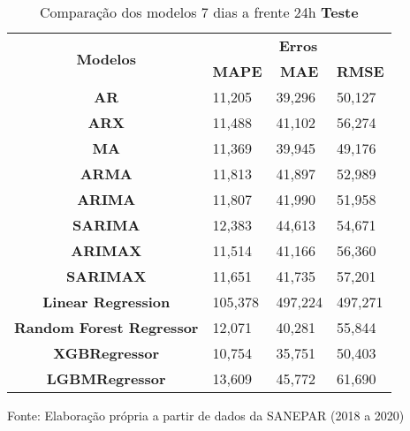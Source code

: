 \begin{table}[H]
	\centering
	\caption{Comparação dos modelos 7 dias a frente 24h \textbf{Teste} }\label{tb:10-24tst}
	\begin{tabular}{@{}clll@{}}
		\toprule
		\multirow{2}{*}{\textbf{Modelos}} & \multicolumn{3}{c}{\textbf{Erros}}                                                                       \\ \cmidrule(l){2-4} 
		& \multicolumn{1}{c}{\textbf{MAPE}} & \multicolumn{1}{c}{\textbf{MAE}} & \multicolumn{1}{c}{\textbf{RMSE}} \\ \hline
\textbf{AR}                       & 11,205                            & 39,296                           & 50,127                            \\
\textbf{ARX}                      & 11,488                            & 41,102                           & 56,274                            \\
\textbf{MA}                       & 11,369                            & 39,945                           & 49,176                            \\
\textbf{ARMA}                     & 11,813                            & 41,897                           & 52,989                            \\
\textbf{ARIMA}                    & 11,807                            & 41,990                           & 51,958                            \\
\textbf{SARIMA}                   & 12,383                            & 44,613                           & 54,671                            \\
\textbf{ARIMAX}                   & 11,514                            & 41,166                           & 56,360                            \\
\textbf{SARIMAX}                  & 11,651                            & 41,735                           & 57,201                            \\
\textbf{Linear Regression}        & 105,378                           & 497,224                          & 497,271                           \\
\textbf{Random Forest Regressor}  & 12,071                            & 40,281                           & 55,844                            \\
\textbf{XGBRegressor}             & 10,754                            & 35,751                           & 50,403                            \\
\textbf{LGBMRegressor}            & 13,609                            & 45,772                           & 61,690                            \\ \bottomrule
	\end{tabular}

Fonte: Elaboração própria a partir de dados da SANEPAR (2018 a 2020)
\end{table}

